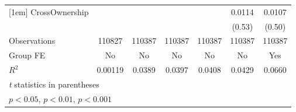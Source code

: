 {\begin{tabular}{l*{6}{c}}
[1em]
CrossOwnership  &                  &                  &                  &                  &   0.0114         &   0.0107         \\
                &                  &                  &                  &                  &   (0.53)         &   (0.50)         \\
\hline
Observations    &   110827         &   110387         &   110387         &   110387         &   110387         &   110387         \\
Group FE        &       No         &       No         &       No         &       No         &       No         &      Yes         \\
$ R^2 $         &  0.00119         &   0.0389         &   0.0397         &   0.0408         &   0.0429         &   0.0660         \\
\hline\hline
\multicolumn{7}{l}{\footnotesize \textit{t} statistics in parentheses}\\
\multicolumn{7}{l}{\footnotesize \sym{*} \(p<0.05\), \sym{**} \(p<0.01\), \sym{***} \(p<0.001\)}\\
\end{tabular}
}
